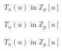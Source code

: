 \documentclass{beamer}
\begin{document}
\begin{frame}{$T_n(u)$ in $\mathbb{Z}_p[u]$}
 \vspace{-18pt}
\end{frame}

\begin{frame}{$T_n(u)$ in $\mathbb{Z}_p[u]$}
\end{frame}

\begin{frame}{$T_n(u)$ in $\mathbb{Z}_p[u]$}
 \vspace{-18pt}
\end{frame}
\end{document}
